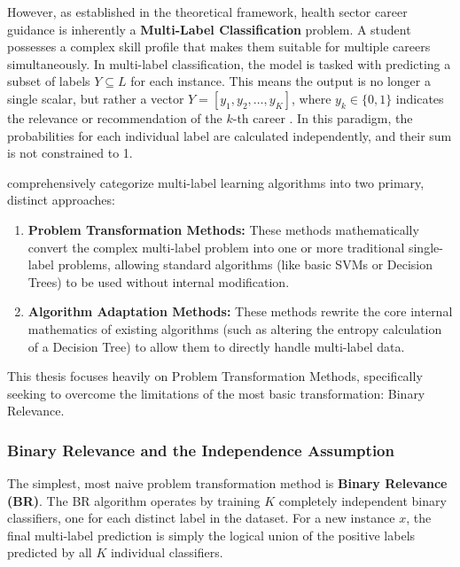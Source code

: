 However, as established in the theoretical framework, health sector career guidance is inherently a \textbf{Multi-Label Classification} problem. A student possesses a complex skill profile that makes them suitable for multiple careers simultaneously. In multi-label \parencite{tsoumakas2007multi} classification, the model is tasked with predicting a subset of labels $Y \subseteq L$ for each instance. This means the output is no longer a single scalar, but rather a vector $Y = [y_1, y_2, \dots, y_K]$, where $y_k \in \{0, 1\}$ indicates the relevance or recommendation of the $k$-th career \autocite{tsoumakas2007multi}. In this paradigm, the probabilities for each individual label are calculated independently, and their sum is not constrained to 1.

\textcite{zhang2013review} comprehensively categorize multi-label \parencite{tsoumakas2007multi} learning algorithms into two primary, distinct approaches:
\begin{enumerate}
    \item \textbf{Problem Transformation Methods:} These methods mathematically convert the complex multi-label \parencite{tsoumakas2007multi} problem into one or more traditional single-label problems, allowing standard algorithms (like basic SVMs or Decision Trees) to be used without internal modification.
    \item \textbf{Algorithm Adaptation Methods:} These methods rewrite the core internal mathematics of existing algorithms (such as altering the entropy calculation of a Decision Tree) to allow them to directly handle multi-label \parencite{tsoumakas2007multi} data.
\end{enumerate}
This thesis focuses heavily on Problem Transformation Methods, specifically seeking to overcome the limitations of the most basic transformation: Binary Relevance.

\subsubsection{Binary Relevance and the Independence Assumption}

The simplest, most naive problem transformation method is \textbf{Binary Relevance (BR)}. The BR algorithm operates by training $K$ completely independent binary classifiers, one for each distinct label in the dataset. For a new instance $x$, the final multi-label \parencite{tsoumakas2007multi} prediction is simply the logical union of the positive labels predicted by all $K$ individual classifiers.

